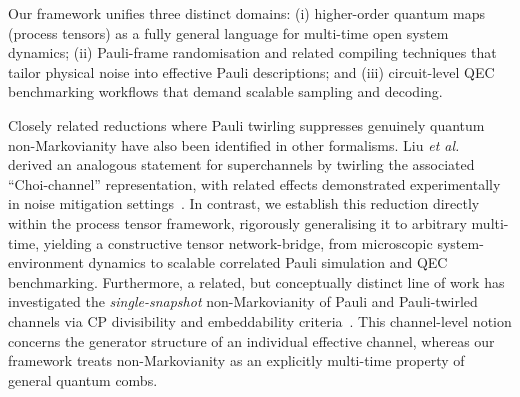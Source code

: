 Our framework unifies three distinct domains: (i) higher-order quantum maps (process tensors) as a fully general language for multi-time open system dynamics; (ii) Pauli-frame randomisation and related compiling techniques that tailor physical noise into effective Pauli descriptions; and (iii) circuit-level QEC benchmarking workflows that demand scalable sampling and decoding.

Closely related reductions where Pauli twirling suppresses genuinely quantum non-Markovianity have also been identified in other formalisms. Liu \emph{et al.}~\cite{liuNonMarkovianNoiseSuppression2024} derived an analogous statement for superchannels by twirling the associated ``Choi-channel'' representation, with related effects demonstrated experimentally in noise mitigation settings~\cite{liuRealizingUniversalNonMarkovian2025}. In contrast, we establish this reduction directly within the process tensor framework, rigorously generalising it to arbitrary multi-time, yielding a constructive tensor network-bridge, from microscopic system-environment dynamics to scalable correlated Pauli simulation and QEC benchmarking. Furthermore, a related, but conceptually distinct line of work has investigated the \emph{single-snapshot} non-Markovianity of Pauli and Pauli-twirled channels via CP divisibility and embeddability criteria~\cite{kattemolleNonMarkovianityInducedPaulitwirling2026,seifSingleSnapshotNonMarkovianity2026}. This channel-level notion concerns the generator structure of an individual effective channel, whereas our framework treats non-Markovianity as an explicitly multi-time property of general quantum combs.

